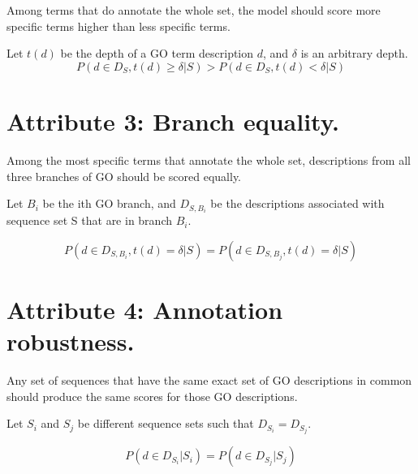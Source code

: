 \documentclass{specification}
\begin{document}
Among terms that do annotate the whole set, the model should score more specific terms higher than less specific terms.

Let $t(d)$ be the depth of a GO term description $d$, and $\delta$ is an arbitrary depth.
\[P(d \in D_{S}, t(d) \geq \delta | S) > P(d \in D_{S}, t(d) < \delta | S)\]

\section*{Attribute 3: Branch equality.}

Among the most specific terms that annotate the whole set, descriptions from all three branches of GO should be scored equally.

Let $B_i$ be the ith GO branch, and $D_{S, B_i}$ be the descriptions associated with sequence set S that are in branch $B_i$.

\[P(d \in D_{S, B_i}, t(d) = \delta | S) = P(d \in D_{S, B_j}, t(d) = \delta | S)\]

\section*{Attribute 4: Annotation robustness.}

Any set of sequences that have the same exact set of GO descriptions in common should produce the same scores for those GO descriptions.

Let $S_i$ and $S_j$ be different sequence sets such that $D_{S_i} = D_{S_j}$.

\[P(d \in D_{S_i} | S_i) = P(d \in D_{S_j} | S_j)\]

 
%
%



\printbibliography
\end{document}
